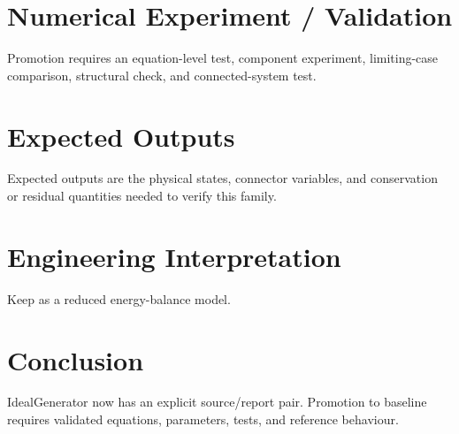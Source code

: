 \documentclass[10pt,a4paper]{article}
\begin{document}
\section{Numerical Experiment / Validation}Promotion requires an equation-level test, component experiment, limiting-case comparison, structural check, and connected-system test.
\section{Expected Outputs}Expected outputs are the physical states, connector variables, and conservation or residual quantities needed to verify this family.
\section{Engineering Interpretation}Keep as a reduced energy-balance model.
\section*{Conclusion}IdealGenerator now has an explicit source/report pair. Promotion to baseline requires validated equations, parameters, tests, and reference behaviour.
\end{document}
